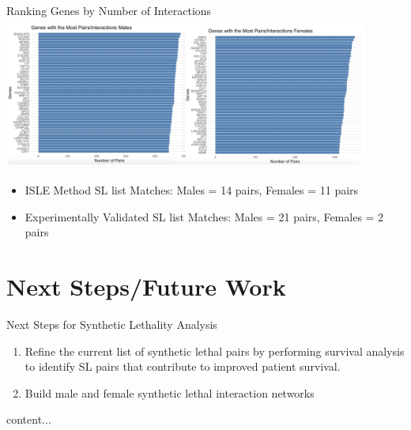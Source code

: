 \documentclass{beamer}
\begin{document}
	\begin{frame}{Ranking Genes by Number of Interactions}
		\includegraphics[width=12cm, height=5cm]{interactions.png}
		
		\begin{itemize}
		\item ISLE Method SL list Matches: Males = 14 pairs, Females = 11 pairs
		\item Experimentally Validated SL list Matches: Males = 21 pairs, Females = 2 pairs
		\end{itemize}
	\end{frame}

	\section{Next Steps/Future Work}
	\begin{frame}{Next Steps for Synthetic Lethality Analysis}
		\begin{enumerate}
			\item Refine the current list of synthetic lethal pairs by performing survival analysis to identify SL pairs that contribute to improved patient survival.
			\item Build male and female synthetic lethal interaction networks
		\end{enumerate}
	\end{frame}

	\begin{frame}{}
		content...
	\end{frame}


	
\end{document}
